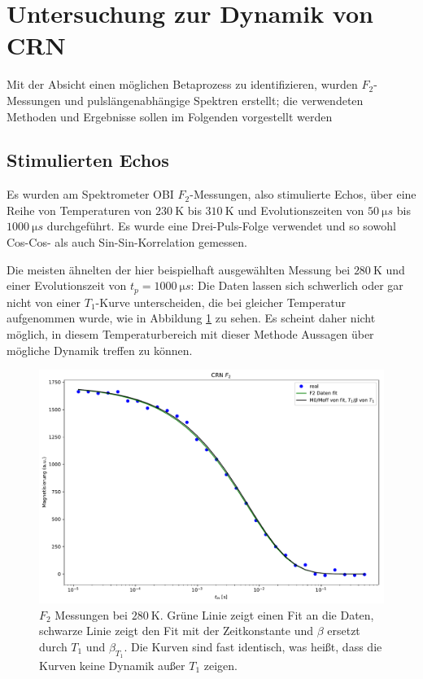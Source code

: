 \section{Untersuchung zur Dynamik von CRN} \label{section:res:F_2}

Mit der Absicht einen möglichen Betaprozess zu identifizieren, wurden $F_2$-Messungen und pulslängenabhängige Spektren erstellt; die verwendeten Methoden und Ergebnisse sollen im Folgenden vorgestellt werden

\subsection{Stimulierten Echos} \label{section:res:stimechos}

Es wurden am Spektrometer OBI $F_2$-Messungen, also stimulierte Echos, über eine Reihe von Temperaturen von $\SI{230}{\kelvin}$ bis $\SI{310}{\kelvin}$ und Evolutionszeiten von $\SI{50}{\micro s}$ bis $\SI{1000}{\micro s}$ durchgeführt. Es wurde eine Drei-Puls-Folge verwendet und so sowohl Cos-Cos- als auch Sin-Sin-Korrelation gemessen.

Die meisten ähnelten der hier beispielhaft ausgewählten Messung bei $\SI{280}{\kelvin}$ und einer Evolutionszeit von $t_p = \SI{1000}{\micro s}$: Die Daten lassen sich schwerlich oder gar nicht von einer $T_1$-Kurve unterscheiden, die bei gleicher Temperatur aufgenommen wurde, wie in Abbildung \ref{fig:res:F_2_tieftemp} zu sehen. Es scheint daher nicht möglich, in diesem Temperaturbereich mit dieser Methode Aussagen über mögliche Dynamik treffen zu können.
\begin{figure}
	\begin{center}
		\includegraphics[width=.9\textwidth]{graphics/plots/F2/f2_tieftemp.pdf}
	\end{center}
	\caption{$F_2$ Messungen bei $\SI{280}{\kelvin}$. Grüne Linie zeigt einen Fit an die Daten, schwarze Linie zeigt den Fit mit der Zeitkonstante und $\beta$ ersetzt durch $T_1$ und $\beta_{T_1}$. Die Kurven sind fast identisch, was heißt, dass die Kurven keine Dynamik außer $T_1$ zeigen.} \label{fig:res:F_2_tieftemp}
\end{figure}

